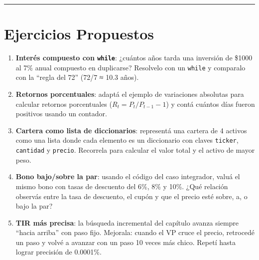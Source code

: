 \documentclass[
  spanish,
  letterpaper,
  DIV=11,
  numbers=noendperiod]{scrreprt}
\providecommand{\tightlist}{%
  \setlength{\itemsep}{0pt}\setlength{\parskip}{0pt}}
\begin{document}
\begin{center}\rule{0.5\linewidth}{0.5pt}\end{center}

\section{Ejercicios Propuestos}\label{ejercicios-propuestos-1}

\begin{tcolorbox}[enhanced jigsaw, bottomrule=.15mm, colback=white, opacitybacktitle=0.6, arc=.35mm, toprule=.15mm, opacityback=0, breakable, titlerule=0mm, left=2mm, coltitle=black, colbacktitle=quarto-callout-important-color!10!white, colframe=quarto-callout-important-color-frame, leftrule=.75mm, toptitle=1mm, bottomtitle=1mm, title=\textcolor{quarto-callout-important-color}{\faExclamation}\hspace{0.5em}{Ejercicios}, rightrule=.15mm]

\begin{enumerate}
\def\labelenumi{\arabic{enumi}.}
\tightlist
\item
  \textbf{Interés compuesto con \texttt{while}}: ¿cuántos años tarda una
  inversión de \$1000 al 7\% anual compuesto en duplicarse? Resolvelo
  con un \texttt{while} y comparalo con la ``regla del 72'' (72/7 ≈ 10.3
  años).
\item
  \textbf{Retornos porcentuales}: adaptá el ejemplo de variaciones
  absolutas para calcular retornos porcentuales
  (\(R_t = P_t/P_{t-1} - 1\)) y contá cuántos días fueron positivos
  usando un contador.
\item
  \textbf{Cartera como lista de diccionarios}: representá una cartera de
  4 activos como una lista donde cada elemento es un diccionario con
  claves \texttt{ticker}, \texttt{cantidad} y \texttt{precio}. Recorrela
  para calcular el valor total y el activo de mayor peso.
\item
  \textbf{Bono bajo/sobre la par}: usando el código del caso integrador,
  valuá el mismo bono con tasas de descuento del 6\%, 8\% y 10\%. ¿Qué
  relación observás entre la tasa de descuento, el cupón y que el precio
  esté sobre, a, o bajo la par?
\item
  \textbf{TIR más precisa}: la búsqueda incremental del capítulo avanza
  siempre ``hacia arriba'' con paso fijo. Mejorala: cuando el VP cruce
  el precio, retrocedé un paso y volvé a avanzar con un paso 10 veces
  más chico. Repetí hasta lograr precisión de 0.0001\%.
\end{enumerate}

\end{tcolorbox}
\end{document}
